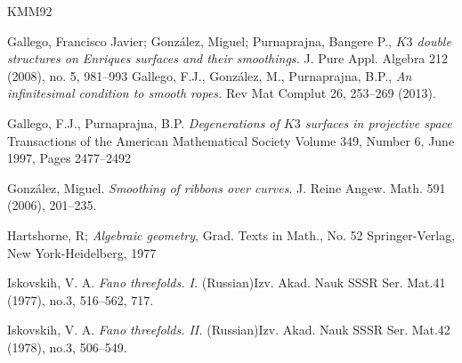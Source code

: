 \documentclass[11pt,twoside]{amsart}
\theoremstyle{plain}
\numberwithin{equation}{section}
\theoremstyle{definition}
\begin{document}
\begin{thebibliography}{KMM92}

 

\color{black}




Gallego, Francisco Javier; González, Miguel; Purnaprajna, Bangere P., 
\emph{$K3$ double structures on Enriques surfaces and their smoothings.}
J. Pure Appl. Algebra 212 (2008), no. 5, 981--993
Gallego, F.J., González, M., Purnaprajna, B.P., 
\emph{An infinitesimal condition to smooth ropes.}
Rev Mat Complut 26, 253–269 (2013).



Gallego, F.J., Purnaprajna, B.P.
\emph{Degenerations of $K3$ surfaces in projective space}
Transactions of the American Mathematical Society
Volume 349, Number 6, June 1997, Pages 2477–2492

  Gonz\'alez, Miguel.
  \emph{Smoothing of ribbons over curves}.
  J. Reine Angew. Math. 591 (2006), 201--235.

  \color{black}


Hartshorne, R; \emph{Algebraic geometry}, 
Grad. Texts in Math., No. 52
Springer-Verlag, New York-Heidelberg, 1977

\color{black}
  




Iskovskih, V. A.
\emph{Fano threefolds. I.}
(Russian)Izv. Akad. Nauk SSSR Ser. Mat.41 (1977), no.3, 516–562, 717.

Iskovskih, V. A.
\emph{Fano threefolds. II.}
(Russian)Izv. Akad. Nauk SSSR Ser. Mat.42 (1978), no.3, 506–549.




\end{thebibliography}
\end{document}
